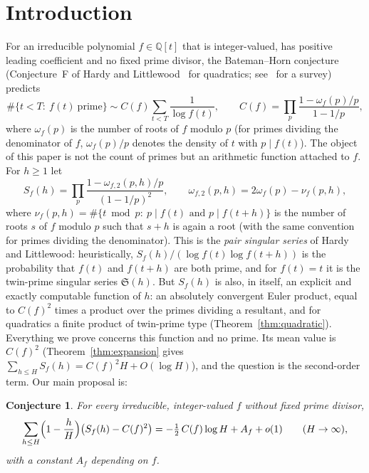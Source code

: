 \documentclass[11pt,a4paper]{article}
\newtheorem{conjecture}[theorem]{Conjecture}
\theoremstyle{remark}\newtheorem{remark}[theorem]{Remark}
\newcommand{\Q}{\mathbb{Q}}
\newcommand{\Sig}{\mathfrak S}
\begin{document}
\section{Introduction}

For an irreducible polynomial $f\in\Q[t]$ that is integer-valued, has positive leading coefficient and
no fixed prime divisor, the Bateman--Horn conjecture~\cite{BatemanHorn1962} (Conjecture~F of Hardy and
Littlewood~\cite{HardyLittlewood1923} for quadratics; see~\cite{Aletheia2020} for a survey) predicts
\begin{equation}\label{eq:BH}
\#\{t<T:\ f(t)\ \text{prime}\}\sim C(f)\sum_{t<T}\frac1{\log f(t)},\qquad
C(f)=\prod_p\frac{1-\omega_f(p)/p}{1-1/p},
\end{equation}
where $\omega_f(p)$ is the number of roots of $f$ modulo $p$ (for primes dividing the denominator of
$f$, $\omega_f(p)/p$ denotes the density of $t$ with $p\mid f(t)$). The object of this paper is not the
count of primes but an arithmetic function attached to $f$. For $h\ge1$ let
\begin{equation}\label{eq:S}
S_f(h)=\prod_p\frac{1-\omega_{f,2}(p,h)/p}{(1-1/p)^2},\qquad
\omega_{f,2}(p,h)=2\omega_f(p)-\nu_f(p,h),
\end{equation}
where $\nu_f(p,h)=\#\{t\bmod p:\ p\mid f(t)\text{ and }p\mid f(t+h)\}$ is the number of roots $s$ of
$f$ modulo $p$ such that $s+h$ is again a root (with the same convention for primes dividing the
denominator). This is the \emph{pair singular series} of Hardy and Littlewood: heuristically,
$S_f(h)/(\log f(t)\log f(t+h))$ is the probability that $f(t)$ and $f(t+h)$ are both prime, and for
$f(t)=t$ it is the twin-prime singular series $\Sig(h)$. But $S_f(h)$ is also, in itself, an explicit
and exactly computable function of $h$: an absolutely convergent Euler product, equal to $C(f)^2$ times
a product over the primes dividing a resultant, and for quadratics a finite product of twin-prime type
(Theorem~\ref{thm:quadratic}). Everything we prove concerns this function and no prime. Its mean value is
$C(f)^2$ (Theorem~\ref{thm:expansion} gives $\sum_{h\le H}S_f(h)=C(f)^2H+O(\log H)$), and the question is
the second-order term. Our main proposal is:

\begin{conjecture}\label{conj}
For every irreducible, integer-valued $f$ without fixed prime divisor,
\begin{equation}\label{eq:conj}
\sum_{h\le H}\Bigl(1-\frac hH\Bigr)\bigl(S_f(h)-C(f)^2\bigr)=-\tfrac12\,C(f)\log H+A_f+o(1)\qquad(H\to\infty),
\end{equation}
with a constant $A_f$ depending on $f$.
\end{conjecture}
\end{document}
